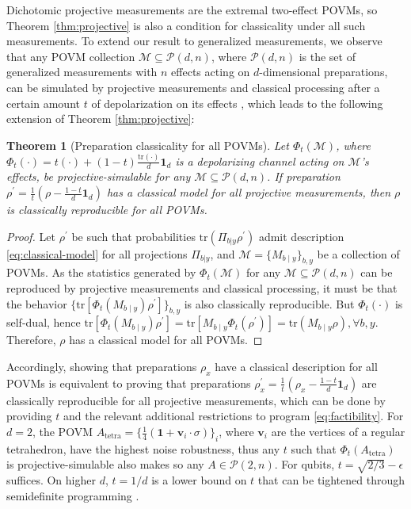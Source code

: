 \documentclass[a4paper,preprintnumbers,floatfix,superscriptaddress,pra,twocolumn,showpacs,notitlepage,longbibliography]{revtex4-2}
\newtheorem{thm}{Theorem}[]
\newcommand{\carlos}[1]{\textcolor{blue}{[CG: {#1}]}}
\begin{document}
    Dichotomic projective measurements are the extremal two-effect POVMs, so Theorem \ref{thm:projective} is also a condition for classicality under all such measurements. To extend our result to generalized measurements, we observe that any POVM collection $\mathcal{M} \subseteq \mathcal{P}(d,n)$, where $\mathcal{P}(d,n)$ is the set of generalized measurements with $n$ effects acting on $d$-dimensional preparations, can be simulated by projective measurements and classical processing after a certain amount $t$ of depolarization on its effects \cite{oszmaniec-simulating-2017}, which leads to the following extension of Theorem \ref{thm:projective}:
    \begin{thm}[Preparation classicality for all POVMs]
        Let $\Phi_{t}(\mathcal{M})$, where $\Phi_t(\cdot) = t(\cdot) + (1-t) \frac{\text{tr}(\cdot)}{d}\bm{1}_d$ is a depolarizing channel acting on $\mathcal{M}$'s effects, be projective-simulable for any $\mathcal{M} \subseteq \mathcal{P}(d,n)$. If preparation $\rho^\prime = \frac{1}{t} \left( \rho - \frac{1-t}{d} \bm{1}_d \right)$ has a classical model for all projective measurements, then $\rho$ is classically reproducible for all POVMs.
        \label{thm:povms}
    \end{thm}
    \begin{proof}
        Let $\rho^\prime$ be such that probabilities $\text{tr}(\Pi_{b \vert y} \rho^\prime)$ admit description \eqref{eq:classical-model} for all projections $\Pi_{b \vert y}$, and $\mathcal{M} = \{ M_{b \mid y} \}_{b, y}$ be a collection of POVMs. As the statistics generated by $\Phi_{t}(\mathcal{M})$ for any $\mathcal{M} \subseteq \mathcal{P}(d,n)$ can be reproduced by projective measurements and classical processing, it must be that the behavior $\{ \text{tr}[\Phi_{t}(M_{b \mid y}) \rho^\prime] \}_{b, y}$ is also classically reproducible. But $\Phi_t(\cdot)$ is self-dual, hence $\text{tr}[\Phi_{t}(M_{b \mid y}) \rho^\prime] = \text{tr}[M_{b \mid y} \Phi_{t}(\rho^\prime)] = \text{tr}(M_{b \mid y} \rho), \forall b, y$. Therefore, $\rho$ has a classical model for all POVMs.
    \end{proof}
    
    Accordingly, showing that preparations $\rho_x$ have a classical description for all POVMs is equivalent to proving that preparations $\rho_x^\prime = \frac{1}{t} \left( \rho_x - \frac{1-t}{d} \bm{1}_d \right)$ are classically reproducible for all projective measurements, which can be done by providing $t$ and the relevant additional restrictions to program \eqref{eq:factibility}. %
    For $d=2$, the POVM $A_{\text{tetra}} = \{ \frac{1}{4}\left( \bm{1} + \bm{v}_i \cdot \sigma \right) \}_i$, where $\bm{v}_i$ are the vertices of a regular tetrahedron, have the highest noise robustness, thus any $t$ such that $\Phi_t(A_{\text{tetra}})$ is projective-simulable also makes so any $A \in \mathcal{P}(2, n)$. For qubits, $t = \sqrt{2/3} - \epsilon$ suffices. On higher $d$, $t=1/d$ is a lower bound on $t$ that can be tightened through semidefinite programming \cite{oszmaniec-simulating-2017}.
    
\end{document}
